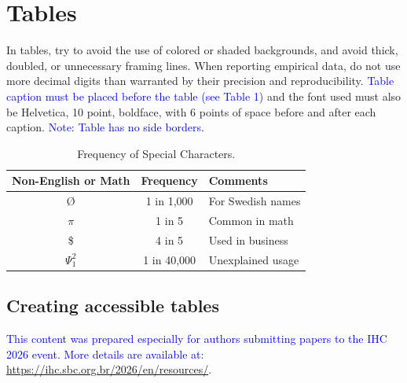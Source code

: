 \documentclass[12pt]{article}
\begin{document}
\section{Tables}

In tables, try to avoid the use of colored or shaded backgrounds, and avoid
thick, doubled, or unnecessary framing lines. When reporting empirical data,
do not use more decimal digits than warranted by their precision and
reproducibility. \textcolor{blue}{Table caption must be placed before the table (see Table 1)}
and the font used must also be Helvetica, 10 point, boldface, with 6 points of
space before and after each caption. \textcolor{blue}{Note: Table has no side borders.}

\begin{table}
  \caption{Frequency of Special Characters.}
  \centering
  \label{tab:freq}
  \begin{tabular}{c|c|l}
    \hline
    Non-English or Math&Frequency&Comments\\
    \hline
    \O & 1 in 1,000& For Swedish names\\
    \hline
    $\pi$ & 1 in 5& Common in math\\
    \hline
    \$ & 4 in 5 & Used in business\\
    \hline
    $\Psi^2_1$ & 1 in 40,000& Unexplained usage\\
    \hline
\end{tabular}
\end{table}
\subsection{Creating accessible tables}

\textcolor{blue}{This content was prepared especially for authors submitting papers to the IHC 2026 event. More details are available at: \url{https://ihc.sbc.org.br/2026/en/resources/}.}
\end{document}
